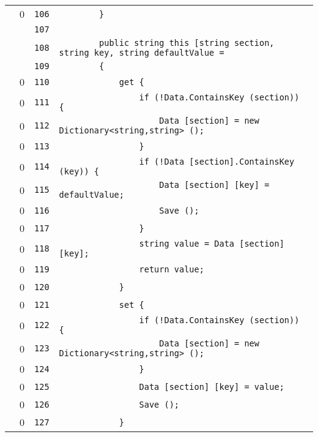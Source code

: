 \documentclass[a4paper,10pt]{article}
\begin{document}
\begin{longtable}[l]{lrrl}
\cellcolor{red} & 0 & \verb~106~ & \verb~        }~\\
\cellcolor{gray} &  & \verb~107~ & \verb~~\\
\cellcolor{gray} &  & \verb~108~ & \verb~        public string this [string section, string key, string defaultValue = ~\\
\cellcolor{gray} &  & \verb~109~ & \verb~        {~\\
\cellcolor{red} & 0 & \verb~110~ & \verb~            get {~\\
\cellcolor{red} & 0 & \verb~111~ & \verb~                if (!Data.ContainsKey (section)) {~\\
\cellcolor{red} & 0 & \verb~112~ & \verb~                    Data [section] = new Dictionary<string,string> ();~\\
\cellcolor{red} & 0 & \verb~113~ & \verb~                }~\\
\cellcolor{red} & 0 & \verb~114~ & \verb~                if (!Data [section].ContainsKey (key)) {~\\
\cellcolor{red} & 0 & \verb~115~ & \verb~                    Data [section] [key] = defaultValue;~\\
\cellcolor{red} & 0 & \verb~116~ & \verb~                    Save ();~\\
\cellcolor{red} & 0 & \verb~117~ & \verb~                }~\\
\cellcolor{red} & 0 & \verb~118~ & \verb~                string value = Data [section] [key];~\\
\cellcolor{red} & 0 & \verb~119~ & \verb~                return value;~\\
\cellcolor{red} & 0 & \verb~120~ & \verb~            }~\\
\cellcolor{red} & 0 & \verb~121~ & \verb~            set {~\\
\cellcolor{red} & 0 & \verb~122~ & \verb~                if (!Data.ContainsKey (section)) {~\\
\cellcolor{red} & 0 & \verb~123~ & \verb~                    Data [section] = new Dictionary<string,string> ();~\\
\cellcolor{red} & 0 & \verb~124~ & \verb~                }~\\
\cellcolor{red} & 0 & \verb~125~ & \verb~                Data [section] [key] = value;~\\
\cellcolor{red} & 0 & \verb~126~ & \verb~                Save ();~\\
\cellcolor{red} & 0 & \verb~127~ & \verb~            }~\\

\end{longtable}
\end{document}
